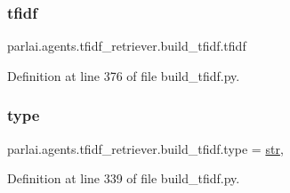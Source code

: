 \subsubsection{\texorpdfstring{tfidf}{tfidf}}
{\footnotesize\ttfamily parlai.\+agents.\+tfidf\+\_\+retriever.\+build\+\_\+tfidf.\+tfidf}



Definition at line 376 of file build\+\_\+tfidf.\+py.

\mbox{\label{namespaceparlai_1_1agents_1_1tfidf__retriever_1_1build__tfidf_ad5dfae268e23f506da084a9efb72f619}} 
\subsubsection{\texorpdfstring{type}{type}}
{\footnotesize\ttfamily parlai.\+agents.\+tfidf\+\_\+retriever.\+build\+\_\+tfidf.\+type = \hyperlink{namespaceparlai_1_1agents_1_1tfidf__retriever_1_1build__tfidf_a213e3a3970a4f1423c2cc41e5f31295e}{str},}



Definition at line 339 of file build\+\_\+tfidf.\+py.


